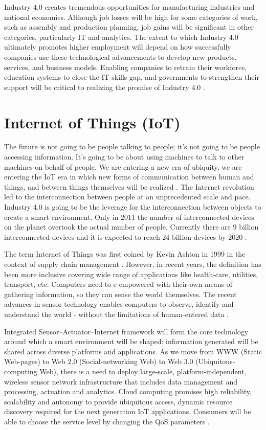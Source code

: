 Industry 4.0 creates tremendous opportunities for manufacturing industries and national economies. Although job losses will be high for some categories of work, such as assembly and production planning, job gains will be significant in other categories, particularly \acs{IT} and analytics. The extent to which Industry 4.0 ultimately promotes higher employment will depend on how successfully companies use these technological advancements to develop new products, services, and business models. Enabling companies to retrain their workforce, education systems to close the \acs{IT} skills gap, and governments to strengthen their support will be critical to realizing the promise of Industry 4.0 \cite{MANMACHINE,INDUSINTERNET}.
\section{Internet of Things (IoT)} \label{IOT}
The future is not going to be people talking to people; it's not going to be people accessing information. It's going to be about using machines to talk to other machines on behalf of people. We are entering a new era of ubiquity, we are entering the \acs{IoT} era in which new forms of communication between human and things, and between things themselves will be realized \cite{IOTFUTURE}. The Internet revolution led to the interconnection between people at an unprecedented scale and pace. Industry 4.0 is going to be the leverage for the interconnection between objects to create a smart environment. Only in 2011 the number of interconnected devices on the planet overtook the actual number of people. Currently there are 9 billion interconnected devices and it is expected to reach 24 billion devices by 2020 \cite{IOTGUBBI}.

The term Internet of Things was first coined by Kevin Ashton in 1999 in the context of supply chain management \cite{IOTFIRST}. However, in recent years, the definition has been more inclusive covering wide range of applications like health-care, utilities, transport, etc. Computers need to e empowered with their own means of gathering information, so they can sense the world themselves. The recent advances in sensor technology enables computers to observe, identify and understand the world - without the limitations of human-entered data \cite{IOTFIRST}.

Integrated Sensor–Actuator–Internet framework will form the core technology around which a smart environment will be shaped: information generated will be shared across diverse platforms and applications. As we move from \acs{WWW} (Static Web-pages) to Web 2.0 (Social-networking Web) to Web 3.0 (Ubiquitous-computing Web), there is a need to deploy large-scale, platform-independent, wireless sensor network infrastructure that includes data management and processing, actuation and analytics. Cloud computing promises high reliability, scalability and autonomy to provide ubiquitous access, dynamic resource discovery required for the next generation \acs{IoT} applications. Consumers will be able to choose the service level by changing the \acs{QoS} parameters \cite{IOTGUBBI}.
